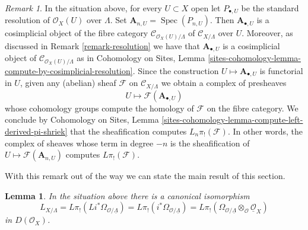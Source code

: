 \documentclass{stacks-project}
\theoremstyle{plain}
\newtheorem{lemma}[subsection]{Lemma}
\theoremstyle{definition}
\theoremstyle{remark}
\newtheorem{remark}[subsection]{Remark}
\numberwithin{equation}{subsection}
\def\Spec{\mathop{\mathrm{Spec}}}
\begin{document}
\begin{remark}
\label{remark-compute-L-pi-shriek}
In the situation above, for every $U \subset X$ open let
$P_{\bullet, U}$ be the standard resolution of $\mathcal{O}_X(U)$
over $\Lambda$. Set $\mathbf{A}_{n, U} = \Spec(P_{n, U})$. Then
$\mathbf{A}_{\bullet, U}$
is a cosimplicial object of the fibre category
$\mathcal{C}_{\mathcal{O}_X(U)/\Lambda}$ of
$\mathcal{C}_{X/\Lambda}$ over $U$. Moreover, as discussed
in Remark \ref{remark-resolution} we have that $\mathbf{A}_{\bullet, U}$
is a cosimplicial object of $\mathcal{C}_{\mathcal{O}_X(U)/\Lambda}$
as in Cohomology on Sites, Lemma
\ref{sites-cohomology-lemma-compute-by-cosimplicial-resolution}.
Since the construction $U \mapsto \mathbf{A}_{\bullet, U}$ is functorial
in $U$, given any (abelian) sheaf $\mathcal{F}$ on $\mathcal{C}_{X/\Lambda}$
we obtain a complex of presheaves
$$
U \longmapsto \mathcal{F}(\mathbf{A}_{\bullet, U})
$$
whose cohomology groups compute the homology of $\mathcal{F}$ on the fibre
category. We conclude by
Cohomology on Sites, Lemma
\ref{sites-cohomology-lemma-compute-left-derived-pi-shriek}
that the sheafification computes $L_n\pi_!(\mathcal{F})$.
In other words, the complex of sheaves whose term in degree $-n$ is
the sheafification of $U \mapsto \mathcal{F}(\mathbf{A}_{n, U})$ computes
$L\pi_!(\mathcal{F})$.
\end{remark}

\noindent
With this remark out of the way we can state the main
result of this section.

\begin{lemma}
\label{lemma-cotangent-morphism-schemes}
In the situation above there is a canonical isomorphism
$$
L_{X/\Lambda} = 
L\pi_!(Li^*\Omega_{\mathcal{O}/\underline{\Lambda}}) =
L\pi_!(i^*\Omega_{\mathcal{O}/\underline{\Lambda}}) =
L\pi_!(\Omega_{\mathcal{O}/\underline{\Lambda}}
\otimes_\mathcal{O} \underline{\mathcal{O}}_X)
$$
in $D(\mathcal{O}_X)$.
\end{lemma}
\end{document}

